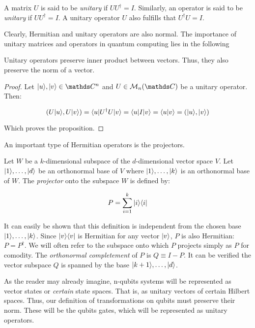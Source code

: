 \begin{definition}
	A matrix $U$ is said to be \emph{unitary} if $UU^\dagger = I$. Similarly, an operator is said to be \emph{unitary} if $UU^\dagger = I$. A unitary operator $U$ also fulfills that $U^\dagger U = I$.
\end{definition}

Clearly, Hermitian and unitary operators are also normal. The importance of unitary matrices and operators in quantum computing lies in the following

\begin{proposition}
	Unitary operators preserve inner product between vectors. Thus, they also preserve the norm of a vector.
\end{proposition}

\begin{proof}
	Let $|u\ra, |v\ra \in \C^n$ and $U \in \mathcal{M}_n(\C)$ be a unitary operator. Then:
	
	$$ ( U|u\rangle, U|v\rangle) = \langle u|U^\dagger U|v\rangle = \langle u|I|v\rangle = \langle u|v\rangle = ( |u\rangle, |v\rangle) $$
	
	Which proves the proposition.
\end{proof}

An important type of Hermitian operators is the projectors.

\begin{definition}
	Let $W$ be a $k$-dimensional subspace	 of the $d$-dimensional vector space $V$. Let $|1\rangle, \dots, |d\rangle$ be an orthonormal base of $V$ where $|1\rangle, \dots, |k\rangle$ is an orthonormal base of $W$. The \emph{projector} onto the subspace $W$ is defined by:
	
	$$ P = \sum_{i=1}^k |i \rangle\langle i| $$
\end{definition}

It can easily be shown that this definition is independent from the chosen base $|1\rangle, \dots, |k\rangle$. Since $|v \rangle\langle v|$ is Hermitian for any vector $|v\rangle$, $P$ is also Hermitian: $P = P^\dagger$. We will often refer to the subspace onto which $P$ projects simply as $P$ for comodity. The \emph{orthonormal completement} of $P$ is $Q \equiv I - P$. It can be verified the vector subspace $Q$ is spanned by the base $|k+1\rangle, \dots, |d\rangle$.

As the reader may already imagine, n-qubits systems will be represented as vector states or \emph{certain} state spaces. That is, as unitary vectors of certain Hilbert spaces. Thus, our definition of transformations on qubits must preserve their norm. These will be the qubits gates, which will be represented as unitary operators.

